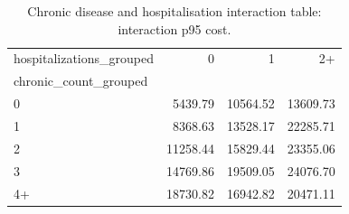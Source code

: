 \begin{table}
\caption{Chronic disease and hospitalisation interaction table: interaction p95 cost.}
\label{tab:02-interaction-p95-cost}
\begin{tabular}{lrrr}
\toprule
hospitalizations_grouped & 0 & 1 & 2+ \\
chronic_count_grouped &  &  &  \\
\midrule
0 & 5439.79 & 10564.52 & 13609.73 \\
1 & 8368.63 & 13528.17 & 22285.71 \\
2 & 11258.44 & 15829.44 & 23355.06 \\
3 & 14769.86 & 19509.05 & 24076.70 \\
4+ & 18730.82 & 16942.82 & 20471.11 \\
\bottomrule
\end{tabular}
\end{table}
